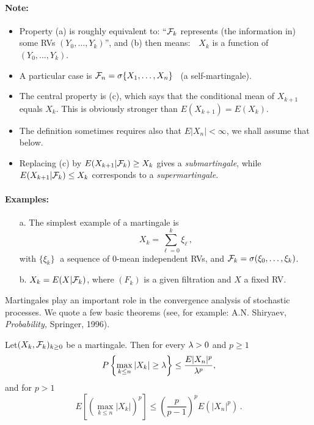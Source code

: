 \paragraph{Note:}
\begin{itemize}
\item
Property (a) is roughly equivalent to: 
``$\mathcal F_k$ represents (the information in)
some RVs $(Y_0, \ldots, Y_k)$'',
and (b) then means:\ \
$X_k$  is a function of $(Y_0, \ldots, Y_k)$.
\item
A particular case is $\mathcal F_n=\sigma\{X_1,\dots,X_n\}$
\ (a self-martingale).
\item
The central property is (c), which says that the conditional mean
of $X_{k+1}$ equals $X_k$. This is obviously
stronger than  $E(X_{k+1})=E(X_k)$.
\item
The definition sometimes requires also that $E|X_n|<\infty$,
we shall assume that below.
\item
Replacing (c) by $E(X_{k+1} | \mathcal F_k) \geq X_k$ gives a {\em submartingale},
while $E(X_{k+1} | \mathcal F_k) \leq X_k$ corresponds to a {\em supermartingale}.
\end{itemize}

\paragraph{Examples:}
\begin{itemize}
\item[a.]
The simplest {example} of a martingale is
$$
X_k = \sum_{\ell=0}^k \xi_\ell\,,
$$
with $\{\xi_k\}\;$ a sequence of 0-mean independent RVs, and
$\mathcal F_k= \sigma (\xi_0, \ldots, \xi_k)$.
\item[b.]
$X_k=E(X|\mathcal F_k)$, where $(F_k)$ is a given filtration and $X$ a fixed RV.
\end{itemize}

Martingales play an important role in the convergence analysis of
stochastic processes. We quote a few basic theorems
(see, for example: A.N. Shiryaev, {\it Probability,} Springer, 1996).

\begin{theorem}

Let$(X_k, \mathcal F_k)_{k\ge 0}$ be a martingale. Then for every $\lambda>0$ and $p\ge 1$
$$
P\left\{ \max_{k\le n} |X_k| \ge \lambda \right\} \le \frac{E |X_n|^p}{\lambda^p},
$$
and for $p>1$
$$
E[(\max_{k\le n}|X_k|)^p ] \le \textstyle{(\frac{p}{p-1})^p} E(|X_n|^p) \,.
$$
\end{theorem}

